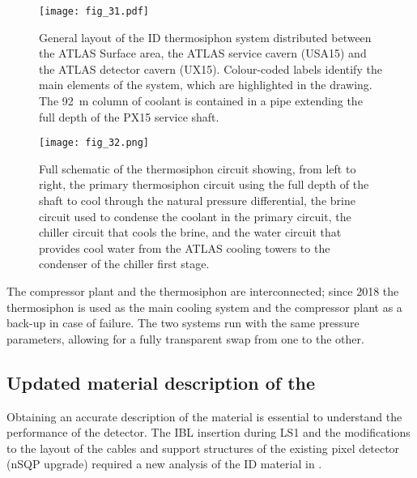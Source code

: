 \documentclass[cernpreprint, atlasdraft=false, UKenglish,british,orcidlogo, texmf, orcidlogo]{atlasdoc}
\begin{document}
\begin{figure}
\centering
\texttt{[image: fig\_31.pdf]}
\caption{
General layout of the \gls{ID} thermosiphon system distributed between the ATLAS Surface area, the ATLAS service cavern (\gls{USA15}) and the ATLAS detector cavern (\gls{UX15}).
Colour-coded labels identify the main elements of the system, which are highlighted in the drawing. The \SI{92}{\m} column of coolant is contained in a pipe extending the full depth of the PX15 service shaft.
}
\label{fig:ID_Thermo_Layout}
\end{figure}
 
\begin{figure}
\centering
\texttt{[image: fig\_32.png]}
\caption{Full schematic of the thermosiphon circuit showing, from left to right, the primary thermosiphon circuit using the full depth of the shaft to cool through the natural pressure differential, the brine circuit used to condense the coolant in the primary circuit, the chiller circuit that cools the brine, and the water circuit that provides cool water from the ATLAS cooling towers to the condenser of the chiller first stage. }
\label{fig:ID_Thermo_Circuit}
\end{figure}
 
The compressor plant and the thermosiphon are interconnected; since 2018 the thermosiphon is used as the main cooling system and the compressor plant as a back-up in case of failure. The two systems run with the same pressure parameters, allowing for a fully transparent swap from one to the other.
 


 

\subsection{Updated material description of the }
 
 
Obtaining an accurate description of the material is essential to understand the performance of the detector.
The \gls{IBL} insertion during \gls{LS1} and the modifications to the layout of the cables and support structures of the existing pixel detector (\gls{nSQP} upgrade) required a new analysis of the \gls{ID} material in \RunTwo.
 
\end{document}
